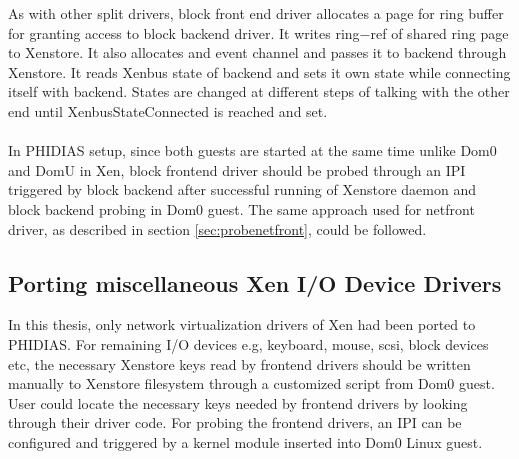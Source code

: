 As with other split drivers, block front end driver allocates a page for ring buffer for granting access to block backend driver. It writes ring−ref of shared ring page to Xenstore. It also allocates and event channel and passes it to backend through Xenstore. It reads Xenbus state of backend and sets it own state while connecting itself with backend. States are changed at different steps of talking with the other end until XenbusStateConnected is reached and set.
\\
\\
In PHIDIAS setup, since both guests are started at the same time unlike Dom0 and DomU in Xen, block frontend driver should be probed through an IPI triggered by block backend after successful running of Xenstore daemon  and block backend probing in Dom0 guest. The same approach used for netfront driver, as described in section \ref{sec:probenetfront}, could be followed.

\subsection{Porting miscellaneous Xen I/O Device Drivers \label{sec:misc}}
In this thesis, only network virtualization drivers of Xen had been ported to PHIDIAS. For remaining I/O devices e.g, keyboard, mouse, scsi, block devices etc, the necessary Xenstore keys read by frontend drivers should be written manually to Xenstore filesystem through a customized script from Dom0 guest. User could locate the necessary keys needed by frontend drivers by looking through their driver code. For probing the frontend drivers, an IPI can be configured and triggered by a kernel module inserted into Dom0 Linux guest. 
